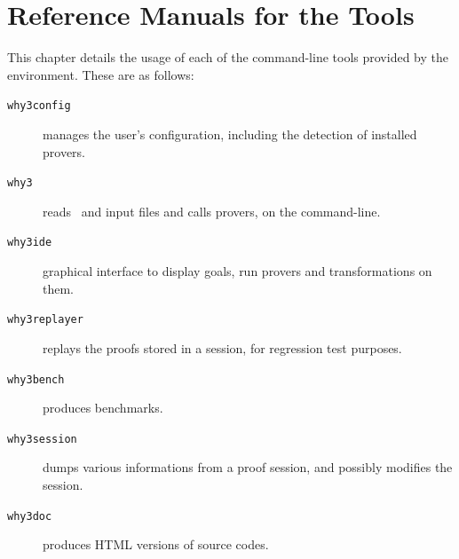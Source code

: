 \chapter{Reference Manuals for the \why Tools}
\label{chap:manpages}

This chapter details the usage of each of the command-line tools
provided by the \why environment. These are as follows:
\begin{description}
\item[\texttt{why3config}] manages the user's configuration,
  including the detection of installed provers.
\item[\texttt{why3}] reads \why\ and \whyml input files and calls
  provers, on the command-line.
\item[\texttt{why3ide}] graphical interface to display goals, run
  provers and transformations on them.
\item[\texttt{why3replayer}] replays the proofs stored in a session,
  for regression test purposes.
\item[\texttt{why3bench}] produces benchmarks.
\item[\texttt{why3session}] dumps various informations from a proof
  session, and possibly modifies the session.
\item[\texttt{why3doc}] produces HTML versions of \why source codes.
\end{description}

